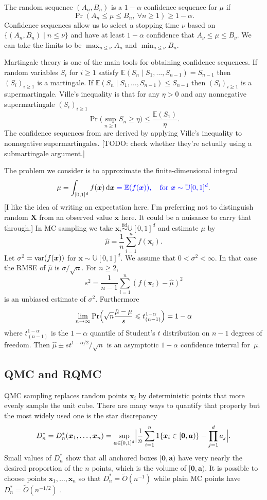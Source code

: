 \documentclass{article}
\newcommand{\art}[1]{\begingroup\color{blue}#1\endgroup}
\newcommand{\fred}[1]{\begingroup\color{red}#1\endgroup}
\renewcommand{\le}{\leqslant}
\renewcommand{\ge}{\geqslant}
\newcommand{\e}{\mathbb{E}}
\newcommand{\bsa}{\boldsymbol{a}}
\newcommand{\bsx}{\boldsymbol{x}}
\newcommand{\bszero}{\boldsymbol{0}}
\newcommand{\simiid}{\stackrel{\mathrm{iid}}{\sim}}
\newcommand{\dunif}{\mathbb{U}}
\newcommand{\giv}{\!\mid\!} %
\newcommand{\rd}{\,\mathrm{d}}
\begin{document}
The random sequence $(A_n,B_n)$ is a $1-\alpha$ confidence sequence
for $\mu$ if
$$
\Pr( A_n \le \mu \le B_n,\ \forall n\ge1)\ge 1-\alpha.
$$
Confidence sequences allow us to select a stopping time
$\nu$ based on $\{(A_n,B_n)\mid n\le\nu\}$ and have
at least $1-\alpha$ confidence that $A_\nu\le \mu\le B_\nu$.
We can take the limits to be $\max_{n\le \nu}A_n$
and $\min_{n\le\nu}B_n$.

Martingale theory is one of the main tools for
obtaining confidence sequences.
If random variables $S_i$ for $i\ge1$
satisfy $\e(S_n\giv S_1,\dots,S_{n-1})=S_{n-1}$
then $(S_i)_{i\ge1}$ is a martingale.
If $\e(S_n\giv S_1,\dots,S_{n-1})\le S_{n-1}$
then $(S_i)_{i\ge1}$ is a supermartingale.
Ville's inequality is that for any $\eta>0$
and any nonnegative supermartingale $(S_i)_{i\ge1}$
$$
\Pr\biggl( \sup_{n\ge1}S_n\ge \eta\biggr)\le\frac{\e(S_1)}\eta.
$$
The confidence sequences from \cite{WauRam24a} are derived
by applying Ville's inequality \cite{vill:1939} to nonnegative supermartingales.
\art{[TODO: check whether they're actually using a submartingale argument.]}


The problem we consider is to approximate the finite-dimensional
integral
$$\mu = \int_{[0,1]^d}f(\bsx)\rd\bsx 
\art{=\e(f(\bsx)),\quad\text{for $\bsx\sim\dunif[0,1]^d$}}.$$
\art{[I like the idea of writing an expectation here. I'm preferring not to distinguish
random $\boldsymbol{X}$ from an observed
value $\bsx$ here. It could be a nuisance to carry
that through.]}
In MC sampling we take $\bsx_i\simiid \dunif[0,1]^d$ and
estimate $\mu$ by
$$
\hat\mu = \frac1n\sum_{i=1}^nf(\bsx_i).
$$
Let $\sigma^2=\var(f(\bsx))$ for $\bsx\sim\dunif[0,1]^d$.
We assume that $0<\sigma^2<\infty$. In that case the RMSE
of $\hat\mu$ is $\sigma/\sqrt{n}$. For $n\ge2$,
$$s^2 =\frac1{n-1}\sum_{i=1}^n(f(\bsx_i)-\hat\mu)^2$$
is an unbiased estimate of $\sigma^2$. Furthermore
$$
\lim_{n\to\infty}\Pr\Bigl( \sqrt{n}\frac{\hat\mu-\mu}s\le t^{1-\alpha}_{(n-1)}\Bigr) = 1-\alpha
$$
where $t^{1-\alpha}_{(n-1)}$ is the $1-\alpha$ quantile of
Student's $t$ distribution on $n-1$ degrees of freedom.
Then $\hat\mu \pm st^{1-\alpha/2}/\sqrt{n}$ is an
asymptotic $1-\alpha$ confidence interval for~$\mu$.

\subsection{QMC and RQMC}

QMC sampling replaces random points $\bsx_i$ by 
deterministic points that more evenly sample the
unit cube.  There are many ways to quantify that 
property but the most widely used one is the
star discrepancy
$$
D_n^* = D_n^*(\bsx_1,\dots,\bsx_n)=\sup_{\bsa\in[0,1]^d}
\Bigl| \frac1n\sum_{i=1}^n1\{\bsx_i\in[\bszero,\bsa)\}
-\prod_{j=1}^da_j\Bigr|.
$$
Small values of $D_n^*$ show that all anchored boxes $[\bszero,\bsa)$
have very nearly the desired proportion of the $n$ points,
which is the volume of $[\bszero,\bsa)$.
It is possible to choose points $\bsx_1,\dots,\bsx_n$ so
that $D_n^*=\tilde O(n^{-1})$ while plain MC points
have $D_n^*=\tilde O(n^{-1/2})$ \cite{Nie92}.
\end{document}
